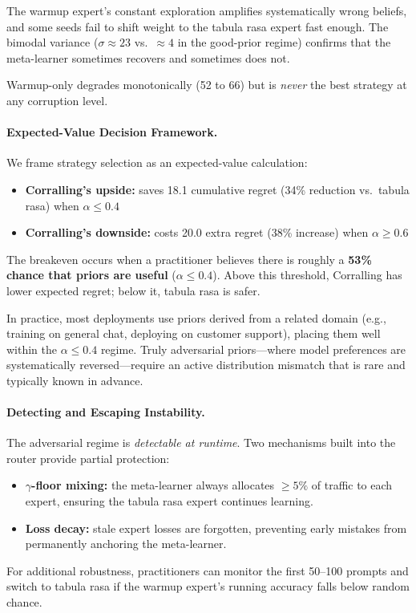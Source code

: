 The warmup expert's constant exploration amplifies systematically
wrong beliefs, and some seeds fail to shift weight to the tabula rasa
expert fast enough.  The bimodal variance ($\sigma{\approx}23$ vs.\
${\approx}4$ in the good-prior regime) confirms that the meta-learner
sometimes recovers and sometimes does not.

Warmup-only degrades monotonically (52 to 66) but is \emph{never}
the best strategy at any corruption level.

\paragraph{Expected-Value Decision Framework.}
We frame strategy selection as an expected-value calculation:
\begin{itemize}[nosep]
    \item \textbf{Corralling's upside:} saves 18.1 cumulative regret
          (34\% reduction vs.\ tabula rasa) when $\alpha \leq 0.4$
    \item \textbf{Corralling's downside:} costs 20.0 extra regret
          (38\% increase) when $\alpha \geq 0.6$
\end{itemize}

The breakeven occurs when a practitioner believes there is roughly a
\textbf{53\% chance that priors are useful} ($\alpha \leq 0.4$).  Above
this threshold, Corralling has lower expected regret; below it, tabula
rasa is safer.

In practice, most deployments use priors derived from a related domain
(e.g., training on general chat, deploying on customer support),
placing them well within the $\alpha \leq 0.4$ regime.  Truly
adversarial priors---where model preferences are systematically
reversed---require an active distribution mismatch that is rare and
typically known in advance.

\paragraph{Detecting and Escaping Instability.}
The adversarial regime is \emph{detectable at runtime}.  Two mechanisms
built into the router provide partial protection:
\begin{itemize}[nosep]
    \item \textbf{$\gamma$-floor mixing:} the meta-learner always
          allocates ${\geq}5\%$ of traffic to each expert, ensuring
          the tabula rasa expert continues learning.
    \item \textbf{Loss decay:} stale expert losses are forgotten,
          preventing early mistakes from permanently anchoring the
          meta-learner.
\end{itemize}
For additional robustness, practitioners can monitor the first 50--100
prompts and switch to tabula rasa if the warmup expert's running
accuracy falls below random chance.

